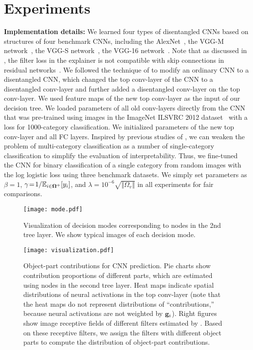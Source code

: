 \documentclass[10pt,twocolumn,letterpaper]{article}
\begin{document}
\section{Experiments}

\textbf{Implementation details:} We learned four types of disentangled CNNs based on structures of four benchmark CNNs, including the AlexNet~\cite{CNNImageNet}, the VGG-M network~\cite{VGG}, the VGG-S network~\cite{VGG}, the VGG-16 network~\cite{VGG}. Note that as discussed in \cite{interpretableCNN}, the filter loss in the explainer is not compatible with skip connections in residual networks~\cite{ResNet}. We followed the technique of \cite{interpretableCNN} to modify an ordinary CNN to a disentangled CNN, which changed the top conv-layer of the CNN to a disentangled conv-layer and further added a disentangled conv-layer on the top conv-layer. We used feature maps of the new top conv-layer as the input of our decision tree. We loaded parameters of all old conv-layers directly from the CNN that was pre-trained using images in the ImageNet ILSVRC 2012 dataset~\cite{ImageNet} with a loss for 1000-category classification. We initialized parameters of the new top conv-layer and all FC layers. Inspired by previous studies of \cite{interpretableCNN}, we can weaken the problem of multi-category classification as a number of single-category classification to simplify the evaluation of interpretability. Thus, we fine-tuned the CNN for binary classification of a single category from random images with the log logistic loss using three benchmark datasets. We simply set parameters as {\small$\beta\!=\!1$}, {\small$\gamma\!=\!1/{\mathbb{E}}_{i\in{\bf\Omega}^{+}}[y_{i}]$}, and {\small$\lambda\!=\!10^{-6}\sqrt{\Vert\Omega_{v}\Vert}$} in all experiments for fair comparisons.

\begin{figure*}
\centering
\texttt{[image: mode.pdf]}
\caption{Visualization of decision modes corresponding to nodes in the 2nd tree layer. We show typical images of each decision mode.}
\label{fig:mode}
\end{figure*}

\begin{figure*}
\centering
\texttt{[image: visualization.pdf]}
\caption{Object-part contributions for CNN prediction. Pie charts show contribution proportions of different parts, which are estimated using nodes in the second tree layer. Heat maps indicate spatial distributions of neural activations in the top conv-layer (note that the heat maps do not represent distributions of ``contributions,'' because neural activations are not weighted by ${\bf g}_{i}$). Right figures show image receptive fields of different filters estimated by {\protect\cite{CNNSemanticDeep}}. Based on these receptive filters, we assign the filters with different object parts to compute the distribution of object-part contributions.}
\label{fig:visualization}
\end{figure*}
\end{document}
